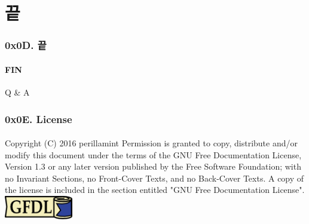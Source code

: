 \section[Section]{끝}
\begin{frame}
  \frametitle{0x0D. 끝}
  \framesubtitle{FIN}

  \begin{center}
    Q \& A
  \end{center}
\end{frame}

\begin{frame}
  \frametitle{0x0E. License}
  \framesubtitle{}
  Copyright (C)  2016 perillamint\linebreak
  Permission is granted to copy, distribute and/or modify this document
  under the terms of the GNU Free Documentation License, Version 1.3
  or any later version published by the Free Software Foundation;\linebreak
  with no Invariant Sections, no Front-Cover Texts, and no Back-Cover Texts.
  A copy of the license is included in the section entitled "GNU
  Free Documentation License".
  \linebreak
  \linebreak
  \linebreak
  \linebreak
  \includegraphics [width=30mm]{img/gfdl-logo-small.png}
\end{frame}


